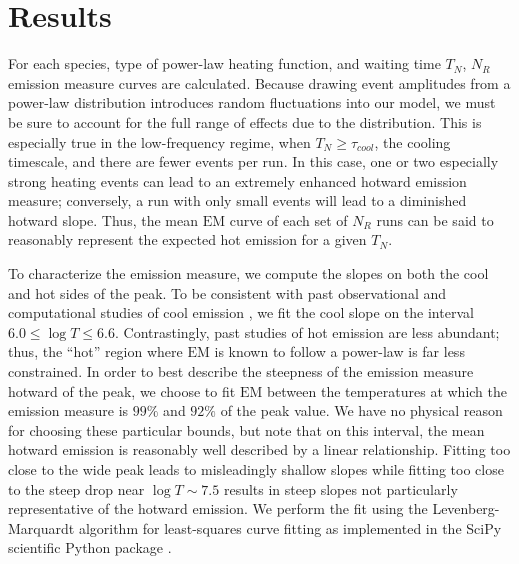 \documentclass[apj]{emulateapj}
\begin{document}
	\section{Results}
	\label{sec:results}
	\par For each species, type of power-law heating function, and waiting time $T_N$, $N_{R}$ emission measure curves are calculated. Because drawing event amplitudes from a power-law distribution introduces random fluctuations into our model, we must be sure to account for the full range of effects due to the distribution. This is especially true in the low-frequency regime, when $T_N\ge\tau_{cool}$, the cooling timescale, and there are fewer events per run. In this case, one or two especially strong heating events can lead to an extremely enhanced hotward emission measure; conversely, a run with only small events will lead to a diminished hotward slope. Thus, the mean $\mathrm{EM}$ curve of each set of $N_{R}$ runs can be said to reasonably represent the expected hot emission for a given $T_N$.
	\par To characterize the emission measure, we compute the slopes on both the cool and hot sides of the peak. To be consistent with past observational and computational studies of cool emission \citep[see][and references therein]{bradshaw_diagnosing_2012}, we fit the cool slope on the interval $6.0\le\log{T}\le6.6$. Contrastingly, past studies of hot emission are less abundant; thus, the ``hot'' region where $\mathrm{EM}$ is known to follow a power-law is far less constrained. In order to best describe the steepness of the emission measure hotward of the peak, we choose to fit $\mathrm{EM}$ between the temperatures at which the emission measure is $99\%$ and $92\%$ of the peak value. We have no physical reason for choosing these particular bounds, but note that on this interval, the mean hotward emission is reasonably well described by a linear relationship. Fitting too close to the wide peak leads to misleadingly shallow slopes while fitting too close to the steep drop near $\log{T}\sim7.5$ results in steep slopes not particularly representative of the hotward emission. We perform the fit using the Levenberg-Marquardt algorithm for least-squares curve fitting as implemented in the SciPy scientific Python package \citep{van_der_walt_numpy_2011}.
\end{document}
